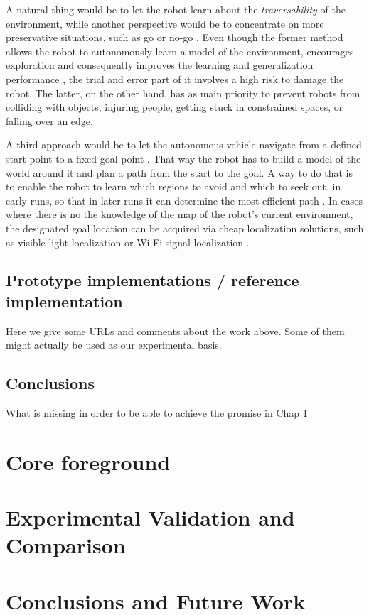 \documentclass[12pt,a4paper]{report}
\newcommand{\term}{\textit}
\newcommand{\acronym}{\MakeUppercase}
\begin{document}
	A natural thing would be to let the robot learn about the \term{traversability} 
	of the environment, while another perspective would be to concentrate on more 
	preservative situations, such as go or no-go \cite{Hirose}. Even though the 
	former method allows the robot to autonomously learn a model of the environment,
	encourages exploration and consequently improves the learning and generalization 
	performance \cite{Zhelo}, the trial and error part of it involves a high risk to 
	damage the robot. The latter, on the other hand, has as main priority to prevent 
	robots from colliding with objects, injuring people, getting stuck in constrained 
	spaces, or falling over an edge. 
	\par
	A third approach would be to let the autonomous vehicle navigate from a defined 
	start point to a fixed goal	point \cite{Shneier, Zhelo}. That way the robot has 
	to build a model of the world around it and plan a path from the start to the 
	goal. A way to do that is to enable the robot to learn which regions to avoid 
	and which to seek out, in early runs, so that in later runs it can determine the 
	most efficient path \cite{Shneier}. In cases where there is no the knowledge of 
	the map of the robot's current environment, the designated goal location can be 
	acquired via cheap localization solutions, such as visible light localization or 
	Wi-Fi signal localization \cite{Zhelo}.
	\\
	
	\section{Prototype implementations / reference implementation}
	\label{sec:bg:code}

	Here we give some \acronym{url}s and comments about the work above. Some of them 
	might actually be used as our experimental basis.
	\\
		
	\begin{table}[h]
		\centering	
		
	\end{table} 
		
	\section{Conclusions}
	\label{sec:bg:concl}
	
	What is missing in order to be able to achieve the promise in Chap 1
	
	
	\chapter{Core foreground}
	\label{sec:fg}
	
	\chapter{Experimental Validation and Comparison}
	\label{sec:exp}
	
	\chapter{Conclusions and Future Work}
	\label{sec:concl}
	
	\renewcommand{\bibname}{References}
	
	
\end{document}
